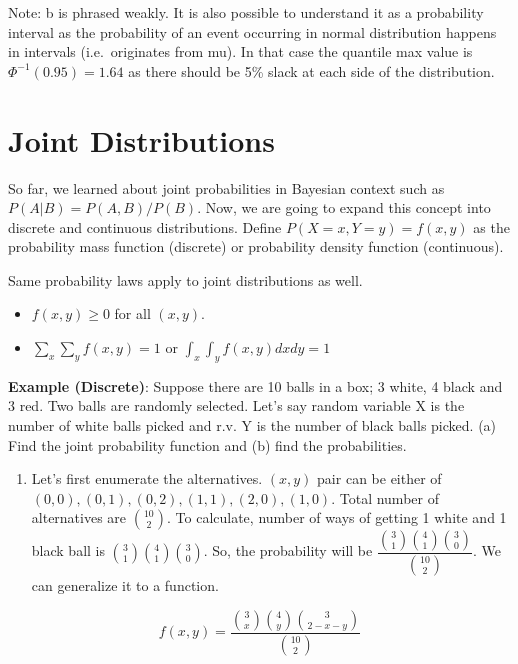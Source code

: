 \documentclass[]{book}
\providecommand{\tightlist}{%
  \setlength{\itemsep}{0pt}\setlength{\parskip}{0pt}}
\theoremstyle{definition}
\theoremstyle{definition}
\theoremstyle{definition}
\theoremstyle{remark}
\begin{document}
Note: b is phrased weakly. It is also possible to understand it as a
probability interval as the probability of an event occurring in normal
distribution happens in intervals (i.e.~originates from mu). In that
case the quantile max value is \(\Phi^{-1}(0.95)=1.64\) as there should
be 5\% slack at each side of the distribution.

\hypertarget{joint-distributions}{%
\chapter{Joint Distributions}\label{joint-distributions}}

So far, we learned about joint probabilities in Bayesian context such as
\(P(A|B) = P(A,B)/P(B)\). Now, we are going to expand this concept into
discrete and continuous distributions. Define \(P(X = x, Y=y) = f(x,y)\)
as the probability mass function (discrete) or probability density
function (continuous).

Same probability laws apply to joint distributions as well.

\begin{itemize}
\tightlist
\item
  \(f(x,y) \ge 0\) for all \((x,y)\).
\item
  \(\sum_x \sum_y f(x,y) = 1\) or \(\int_x \int_y f(x,y) dx dy = 1\)
\end{itemize}

\textbf{Example (Discrete)}: Suppose there are 10 balls in a box; 3
white, 4 black and 3 red. Two balls are randomly selected. Let's say
random variable X is the number of white balls picked and r.v. Y is the
number of black balls picked. (a) Find the joint probability function
and (b) find the probabilities.

\begin{enumerate}
\def\labelenumi{(\alph{enumi})}
\tightlist
\item
  Let's first enumerate the alternatives. \((x,y)\) pair can be either
  of \((0,0),(0,1),(0,2),(1,1),(2,0),(1,0)\). Total number of
  alternatives are \(\binom{10}{2}\). To calculate, number of ways of
  getting 1 white and 1 black ball is
  \(\binom{3}{1}\binom{4}{1}\binom{3}{0}\). So, the probability will be
  \(\dfrac{\binom{3}{1}\binom{4}{1}\binom{3}{0}}{\binom{10}{2}}\). We
  can generalize it to a function.
\end{enumerate}

\[f(x,y) = \dfrac{\binom{3}{x}\binom{4}{y}\binom{3}{2-x-y}}{\binom{10}{2}}\]
\end{document}
